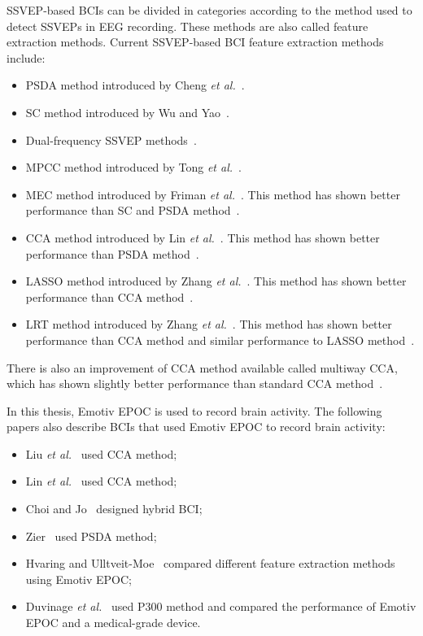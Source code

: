 \gls{SSVEP}-based \glspl{BCI} can be divided in categories according to the method used to detect \glspl{SSVEP} in \gls{EEG} recording. These methods are also called \gls{feature extraction} methods. Current \gls{SSVEP}-based \gls{BCI} \gls{feature extraction} methods include:
\begin{itemize}
	\item \Gls{PSDA} method introduced by Cheng \textit{et al.}~\cite{psda}.
	\item \Gls{SC} method introduced by Wu and Yao~\cite{sc}.
	\item Dual-frequency \gls{SSVEP} methods~\cite{dual1, dual2}.
	\item \Gls{MPCC} method introduced by Tong \textit{et al.}~\cite{MPCC}.
	\item \Gls{MEC} method introduced by Friman \textit{et al.}~\cite{mec}. This method has shown better performance than \gls{SC} and \gls{PSDA} method~\cite{mec_comparison}.
	\item \Gls{CCA} method introduced by Lin \textit{et al.}~\cite{cca_lin}. This method has shown better performance than \gls{PSDA} method~\cite{cca_psda, bin2009cca, cca_lin}.
	\item \Gls{LASSO} method introduced by Zhang \textit{et al.}~\cite{LASSO}. This method has shown better performance than \gls{CCA} method~\cite{LASSO}.
	\item \Gls{LRT} method introduced by Zhang \textit{et al.}~\cite{LRT}. This method has shown better performance than \gls{CCA} method and similar performance to \gls{LASSO} method~\cite{LRT}.
\end{itemize}
There is also an improvement of \gls{CCA} method available called multiway \gls{CCA}, which has shown slightly better performance than standard \gls{CCA} method~\cite{mcca}.

In this thesis, Emotiv EPOC is used to record brain activity. The following papers also describe \glspl{BCI} that used Emotiv EPOC to record brain activity:
\begin{itemize}
	\item Liu \textit{et al.}~\cite{emotiv_11hz} used \gls{CCA} method;
	\item Lin \textit{et al.}~\cite{emotiv_walking} used \gls{CCA} method;
	\item Choi and Jo~\cite{emotiv_hybrid} designed hybrid \gls{BCI};
	\item Zier~\cite{emotiv_psda} used \gls{PSDA} method;
	\item Hvaring and Ulltveit-Moe~\cite{emotiv_comparison} compared different \gls{feature extraction} methods using Emotiv EPOC;
	\item Duvinage \textit{et al.}~\cite{emotiv_p300_comp} used P300 method and compared the performance of Emotiv EPOC and a medical-grade device.
\end{itemize}


